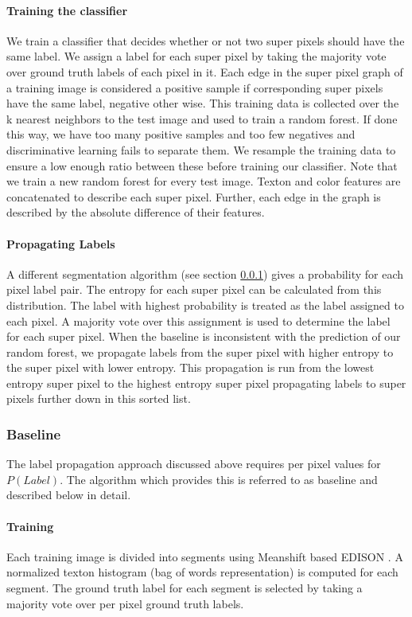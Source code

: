 \documentclass{article} %
\begin{document}
\paragraph{Training the classifier}
We train a classifier that decides whether or not two super pixels should
have the same label.
We assign a label for each super pixel by taking the majority vote over
ground truth labels of each pixel in it.
Each edge in the super pixel graph of a training image is considered a
positive sample if corresponding super pixels have the same label,
negative other wise.
This training data is collected over the k nearest neighbors to the test
image and used to train a random forest.
If done this way, we have too many positive samples and too few negatives
and discriminative learning fails to separate them.
We resample the training data to ensure a low enough ratio between these
before training our classifier.
Note that we train a new random forest for every test image.
Texton and color features are concatenated to describe each super pixel.
Further, each edge in the graph is described by the absolute difference of
their features.

\paragraph{Propagating Labels}
A different segmentation algorithm (see section \ref{baseline}) gives a
probability for each pixel label pair.
The entropy for each super pixel can be calculated from this distribution.
The label with highest probability is treated as the label assigned to
each pixel.
A majority vote over this assignment is used to determine the label for
each super pixel.
When the baseline is inconsistent with the prediction of our random
forest, we propagate labels from the super pixel with higher entropy to
the super pixel with lower entropy.
This propagation is run from the lowest entropy super pixel to the highest
entropy super pixel propagating labels to super pixels further down in
this sorted list.

\subsubsection{Baseline}
\label{baseline}
The label propagation approach discussed above requires per pixel values
for $P(Label)$.
The algorithm which provides this is referred to as baseline and described
below in detail.

\paragraph{Training} Each training image is divided into segments using
Meanshift based EDISON \cite{meanshift}.
A normalized texton histogram (bag of words representation) is computed
for each segment.
The ground truth label for each segment is selected by taking a majority
vote over per pixel ground truth labels.
\end{document}
